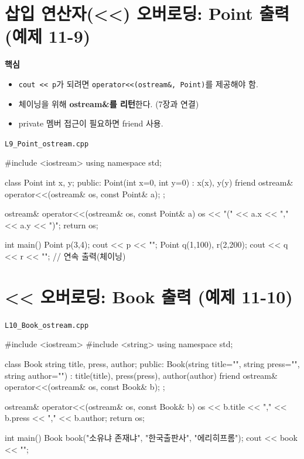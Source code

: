 \documentclass[11pt,a4paper]{article}
\newcommand{\filetag}[1]{\texttt{\color{Accent}#1}}
\begin{document}
\section{삽입 연산자(<<) 오버로딩: Point 출력 (예제 11-9)}
\begin{GoalBox}
\textbf{핵심}
\begin{itemize}[leftmargin=18pt]
  \item \texttt{cout << p}가 되려면 \texttt{operator<<(ostream\&, Point)}를 제공해야 함. %
  \item 체이닝을 위해 \textbf{ostream\&를 리턴}한다. (7장과 연결)
  \item private 멤버 접근이 필요하면 friend 사용.
\end{itemize}
\end{GoalBox}

\noindent\filetag{L9\_Point\_ostream.cpp}
\begin{cppcode}
#include <iostream>
using namespace std;

class Point {
    int x, y;
public:
    Point(int x=0, int y=0) : x(x), y(y) {}
    friend ostream& operator<<(ostream& os, const Point& a);
};

ostream& operator<<(ostream& os, const Point& a) {
    os << "(" << a.x << "," << a.y << ")";
    return os;
}

int main() {
    Point p(3,4);
    cout << p << "\n";
    Point q(1,100), r(2,200);
    cout << q << r << "\n"; // 연속 출력(체이닝)
}
\end{cppcode}

\section{<< 오버로딩: Book 출력 (예제 11-10)}
\noindent\filetag{L10\_Book\_ostream.cpp}
\begin{cppcode}
#include <iostream>
#include <string>
using namespace std;

class Book {
    string title, press, author;
public:
    Book(string title="", string press="", string author="")
        : title(title), press(press), author(author) {}
    friend ostream& operator<<(ostream& os, const Book& b);
};

ostream& operator<<(ostream& os, const Book& b) {
    os << b.title << "," << b.press << "," << b.author;
    return os;
}

int main() {
    Book book("소유냐 존재냐", "한국출판사", "에리히프롬");
    cout << book << "\n";
}
\end{cppcode}
\end{document}
